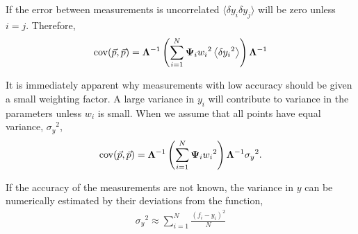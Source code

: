 \documentclass{article}
\def\p{\vec{p}}
\def\LAM{{\bf \Lambda}}
\def\PSI{{\bf \Psi}}
\begin{document}
If the error between measurements is uncorrelated $\langle \delta y_i \delta y_j \rangle$ will be zero unless $i=j$.  Therefore,
\begin{align}
\mathrm{cov}(\p,\p) = \LAM^{-1} \left( \sum_{i=1}^N \PSI_i w_i{^2} \left\langle \delta y_i{^2} \right\rangle \right) \LAM^{-1}\label{eqn:covar}
\end{align}

It is immediately apparent why measurements with low accuracy should be given a small weighting factor.  A large variance in $y_i$ will contribute to variance in the parameters unless $w_i$ is small.  When we assume that all points have equal variance, $\sigma_y{^2}$,
\begin{align}
\mathrm{cov}(\p,\p) =  \LAM^{-1} \left( \sum_{i=1}^N \PSI_i w_i{^2} \right) \LAM^{-1} \sigma_y{^2}.\label{eqn:covar2}
\end{align}

If the accuracy of the measurements are not known, the variance in $y$ can be numerically estimated by their deviations from the function,
\begin{align}
\sigma_y{^2} \approx \sum_{i=1}^N \frac{\left( f_i - y_i \right)^2}{N}
\end{align}
\end{document}
